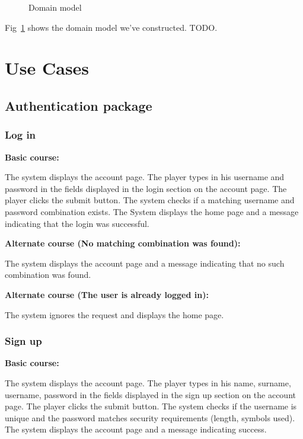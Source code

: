 \documentclass[11pt,a4paper]{article}
\newcommand{\heading}[1]{\vspace{1em}\noindent\textbf{#1}\par\vspace{0.5em}}
\newcommand{\inputdiagram}[1]{}
\newcommand{\textwidthdiagram}[2][1]{%
  \resizebox{#1\textwidth}{!}{\inputdiagram{#2}}%
}
\begin{document}
\begin{figure}[H]
    \centering
    \textwidthdiagram{domain_model.tex}
    \caption{Domain model}
    \label{fig:domain_model}
\end{figure}

Fig~\ref{fig:domain_model} shows the domain model we've constructed. TODO.

\section{Use Cases}

\subsection{Authentication package}

\subsubsection{Log in}

\heading{Basic course:}
The system displays the account page. The player types in his username and password in the fields displayed in the login section on the account page. The player clicks the submit button. The system checks if a matching username and password combination exists. The System displays the home page and a message indicating that the login was successful.

\heading{Alternate course (No matching combination was found):}
The system displays the account page and a message indicating that no such combination was found.

\heading{Alternate course (The user is already logged in):}
The system ignores the request and displays the home page.

\subsubsection{Sign up}

\heading{Basic course:}
The system displays the account page. The player types in his name, surname, username, password in the fields displayed in the sign up section on the account page. The player clicks the submit button. The system checks if the username is unique and the password matches security requirements (length, symbols used). The system displays the account page and a message indicating success.
\end{document}
